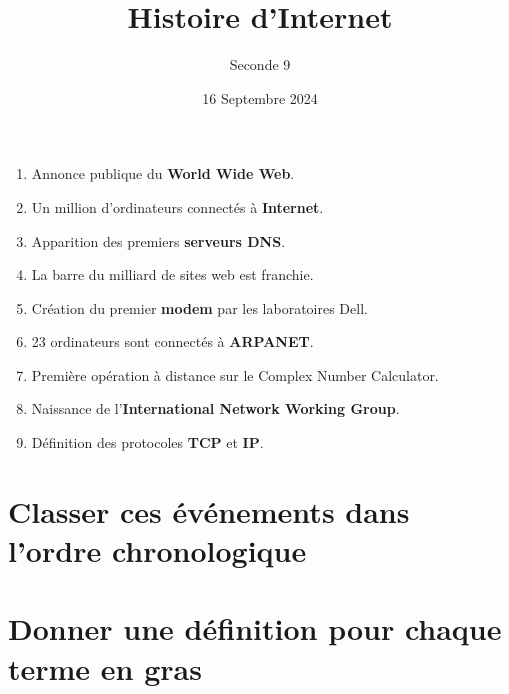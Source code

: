 \documentclass{article}
\title{Histoire d'Internet}
\date{16 Septembre 2024}
\author{Seconde 9}
\begin{document}
\maketitle

\begin{enumerate}
\item Annonce publique du \textbf{World Wide Web}.
\item Un million d'ordinateurs connectés à \textbf{Internet}.
\item Apparition des premiers \textbf{serveurs DNS}.
\item La barre du milliard de sites web est franchie.
\item Création du premier \textbf{modem} par les laboratoires Dell. 
\item 23 ordinateurs sont connectés à \textbf{ARPANET}.
\item Première opération à distance sur le Complex Number Calculator.
\item Naissance de l'\textbf{International Network Working Group}.
\item Définition des protocoles \textbf{TCP} et \textbf{IP}.
\end{enumerate}
\vspace{1cm}
\begin{minipage}{0.45\textwidth}
\section{Classer ces événements dans l'ordre chronologique}
\emptybox{12cm}
\end{minipage}
\hfill\vline\hfill
\begin{minipage}{0.45\textwidth}
\section{Donner une définition pour chaque terme en gras}
\emptybox{12cm}
\end{minipage}
\end{document}
